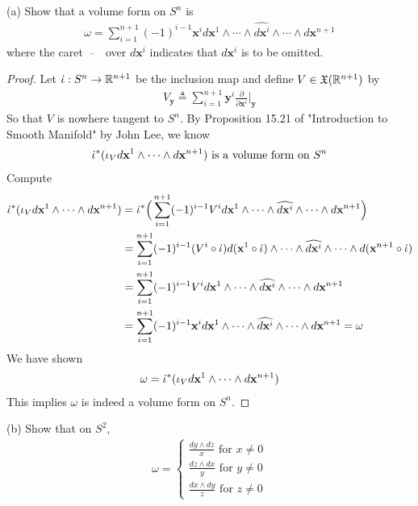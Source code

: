 \documentclass{report}
\begin{document}
\begin{theorem}
 (a) Show that a volume form on $S^n$ is 
     \begin{align*}
    \omega = \sum_{i=1}^{n+1}(-1)^{i-1}\textbf{x}^i d\textbf{x}^1 \wedge \cdots \wedge  \widehat{d\textbf{x}^i} \wedge  \cdots \wedge d\textbf{x}^{n+1}       
    \end{align*}
  where the caret $\text{  }\widehat{}\text{  }$ over $d\textbf{x}^i$ indicates that $d\textbf{x}^i$ is to be omitted. 

\end{theorem}
\begin{proof}
Let $\dot{\iota} : S^{n}\rightarrow \mathbb{R}^{n+1}$ be the inclusion map and define $V \in \mathfrak{X}(\mathbb{R}^{n+1})$ by 
\begin{align*}
V_{\textbf{y}}\triangleq  \sum_{i=1}^{n+1} \textbf{y}^i \frac{\partial }{\partial \textbf{x}^i}\Big|_\textbf{y}
\end{align*}
So that $V$ is nowhere tangent to  $S^{n}$. By Proposition 15.21 of "Introduction to Smooth Manifold" by John Lee, we know  
\begin{align*}
\dot{\iota}^* (\iota_V d\textbf{x}^1 \wedge  \cdots \wedge  d\textbf{x}^{n+1}   ) \text{ is a volume form on }S^n
\end{align*}
Compute
\begin{align*}
\dot{\iota}^*   (\iota_V d\textbf{x}^1\wedge  \cdots \wedge  d\textbf{x}^{n+1}  )&=\dot{\iota}^* \Big(\sum_{i=1}^{n+1}(-1)^{i-1}V^i d\textbf{x}^1 \wedge  \cdots \wedge   \widehat{d\textbf{x}^i} \wedge  \cdots \wedge  d\textbf{x}^{n+1}    \Big)   \\
&=\sum_{i=1}^{n+1}(-1)^{i-1} (V^i \circ \dot{\iota}) d(\textbf{x}^1\circ \dot{\iota}) \wedge  \cdots \wedge \widehat{d\textbf{x}^i} \wedge  \cdots \wedge  d(\textbf{x}^{n+1}\circ \dot{\iota})       \\
&= \sum_{i=1}^{n+1}(-1)^{i-1}V^i d\textbf{x}^1 \wedge  \cdots \wedge  \widehat{d\textbf{x}^i} \wedge  \cdots \wedge d\textbf{x}^{n+1}   \\
&= \sum_{i=1}^{n+1}(-1)^{i-1}\textbf{x}^i d\textbf{x}^1 \wedge  \cdots \wedge  \widehat{d\textbf{x}^i} \wedge  \cdots \wedge d\textbf{x}^{n+1}=\omega
\end{align*}
We have shown 
\begin{align*}
\omega = \dot{\iota}^*(\iota_V d\textbf{x}^1 \wedge  \cdots \wedge  d\textbf{x}^{n+1}   )   
\end{align*}
This implies $\omega$ is indeed a volume form on $S^n$.  
\end{proof}
\begin{theorem}
 (b) Show that on $S^2$, 
 \begin{align*}
 \omega= \begin{cases}
   \frac{dy \wedge  dz}{x}\text{ for }x\neq 0\\
   \frac{dz \wedge  dx}{y}\text{ for }y\neq 0\\
   \frac{dx \wedge  dy}{z}\text{ for }z\neq 0
 \end{cases}
 \end{align*}
\end{theorem}
\end{document}
